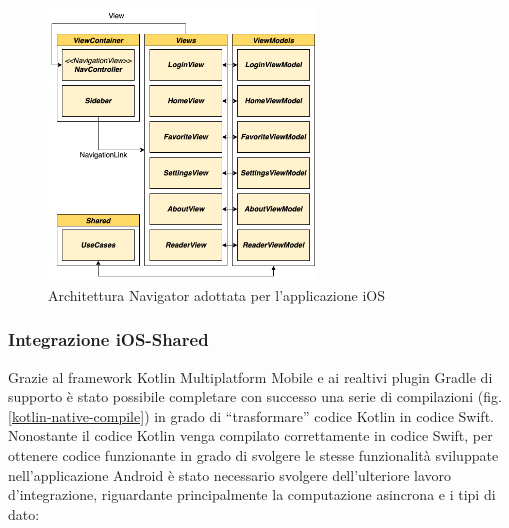 \begin{figure}[H]
\centering
    \includegraphics[width=0.63\textwidth]{img/navigator-arch-ios.png}
    \caption{Architettura Navigator adottata per l'applicazione iOS}
    \label{iosarchapp}
\end{figure}

\subsubsection*{Integrazione iOS-Shared}
\label{integrazione-ios-shared}
Grazie al framework Kotlin Multiplatform Mobile e ai realtivi plugin Gradle di supporto è stato possibile completare con successo una serie di compilazioni (fig. \ref{kotlin-native-compile}) in grado di ``trasformare'' codice Kotlin in codice Swift. 
Nonostante il codice Kotlin venga compilato correttamente in codice Swift, 
per ottenere codice funzionante in grado di svolgere le stesse funzionalità sviluppate nell'applicazione Android è stato necessario svolgere dell'ulteriore lavoro d'integrazione, 
riguardante principalmente la computazione asincrona e i tipi di dato:

